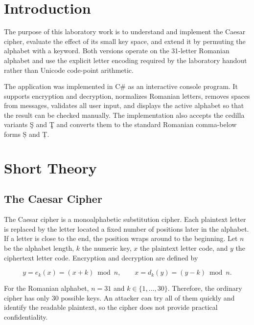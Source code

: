 \documentclass[12pt,a4paper]{article}
\begin{document}
\setcounter{page}{2}
\tableofcontents
\newpage

\section*{Introduction}

The purpose of this laboratory work is to understand and implement the Caesar cipher, evaluate the effect of its small key space, and extend it by permuting the alphabet with a keyword. Both versions operate on the 31-letter Romanian alphabet and use the explicit letter encoding required by the laboratory handout rather than Unicode code-point arithmetic.

The application was implemented in C\# as an interactive console program. It supports encryption and decryption, normalizes Romanian letters, removes spaces from messages, validates all user input, and displays the active alphabet so that the result can be checked manually. The implementation also accepts the cedilla variants Ş and Ţ and converts them to the standard Romanian comma-below forms Ș and Ț.

\newpage
\section{Short Theory}

\subsection{The Caesar Cipher}

The Caesar cipher is a monoalphabetic substitution cipher. Each plaintext letter is replaced by the letter located a fixed number of positions later in the alphabet. If a letter is close to the end, the position wraps around to the beginning. Let $n$ be the alphabet length, $k$ the numeric key, $x$ the plaintext letter code, and $y$ the ciphertext letter code. Encryption and decryption are defined by

\begin{equation}
  y = e_k(x) = (x+k) \bmod n,
  \qquad
  x = d_k(y) = (y-k) \bmod n.
\end{equation}

For the Romanian alphabet, $n=31$ and $k\in\{1,\ldots,30\}$. Therefore, the ordinary cipher has only 30 possible keys. An attacker can try all of them quickly and identify the readable plaintext, so the cipher does not provide practical confidentiality.
\end{document}

